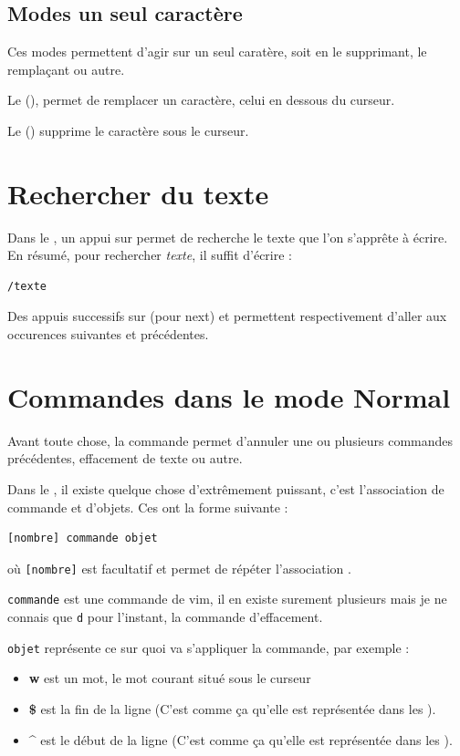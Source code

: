 \documentclass[a4paper,twoside]{article}
\begin{document}
\subsection{Modes \og un seul caractère\fg}
\begin{remarque}
Ces modes permettent d'agir sur un seul caratère, soit en le supprimant, le remplaçant ou autre.
\end{remarque}

Le  (), permet de remplacer un caractère, celui en dessous du curseur.

Le  () supprime le caractère sous le curseur.


\section{Rechercher du texte}
Dans le , un appui sur \touche{/} permet de recherche le texte que l'on s'apprête à écrire. En résumé, pour rechercher \emph{texte}, il suffit d'écrire :
\begin{verbatim}
/texte
\end{verbatim}
Des appuis successifs sur  (pour next) et  permettent respectivement d'aller aux occurences suivantes et précédentes.

\section{Commandes dans le mode Normal}
Avant toute chose, la commande  permet d'annuler une ou plusieurs commandes précédentes, effacement de texte ou autre.

\bigskip

Dans le , il existe quelque chose d'extrêmement puissant, c'est l'association de commande et d'objets. Ces  ont la forme suivante :
\begin{verbatim}
[nombre] commande objet
\end{verbatim}
où \verb|[nombre]| est facultatif et permet de répéter l'association .

\texttt{commande} est une commande de vim, il en existe surement plusieurs mais je ne connais que \texttt{d} pour l'instant, la commande d'effacement.

\texttt{objet} représente ce sur quoi va s'appliquer la commande, par exemple :
\begin{itemize}
\item\textbf{w} est un mot, le mot courant situé sous le curseur
\item\textbf{\$} est la fin de la ligne (C'est comme ça qu'elle est représentée dans les ).
\item\textbf{\^} est le début de la ligne (C'est comme ça qu'elle est représentée dans les ).
\end{itemize}
\end{document}
